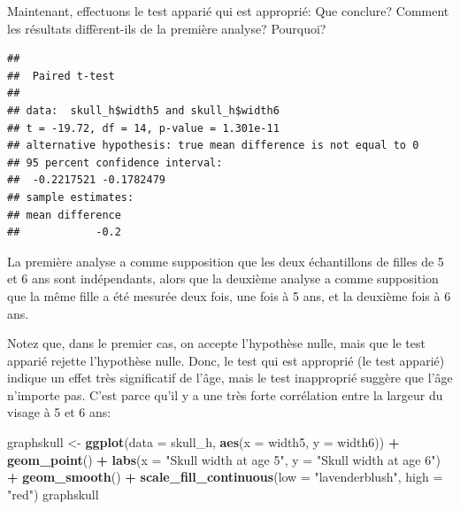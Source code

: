 \documentclass[
  12pt,
]{book}
\newenvironment{Shaded}{\begin{snugshade}}{\end{snugshade}}
\newcommand{\DataTypeTok}[1]{\textcolor[rgb]{0.13,0.29,0.53}{#1}}
\newcommand{\KeywordTok}[1]{\textcolor[rgb]{0.13,0.29,0.53}{\textbf{#1}}}
\newcommand{\NormalTok}[1]{#1}
\newcommand{\OperatorTok}[1]{\textcolor[rgb]{0.81,0.36,0.00}{\textbf{#1}}}
\newcommand{\OtherTok}[1]{\textcolor[rgb]{0.56,0.35,0.01}{#1}}
\newcommand{\StringTok}[1]{\textcolor[rgb]{0.31,0.60,0.02}{#1}}
\begin{document}
Maintenant, effectuons le test apparié qui est approprié: Que conclure? Comment les résultats diffèrent-ils de la première analyse? Pourquoi?

\begin{Shaded}
\end{Shaded}

\begin{verbatim}
## 
##  Paired t-test
## 
## data:  skull_h$width5 and skull_h$width6
## t = -19.72, df = 14, p-value = 1.301e-11
## alternative hypothesis: true mean difference is not equal to 0
## 95 percent confidence interval:
##  -0.2217521 -0.1782479
## sample estimates:
## mean difference 
##            -0.2
\end{verbatim}

La première analyse a comme supposition que les deux échantillons de filles de 5 et 6 ans sont indépendants, alors que la deuxième analyse a comme supposition que la même fille a été mesurée deux fois, une fois à 5 ans, et la deuxième fois à 6 ans.

Notez que, dans le premier cas, on accepte l'hypothèse nulle, mais que le test apparié rejette l'hypothèse nulle. Donc, le test qui est approprié (le test apparié) indique un effet très significatif de l'âge, mais le test inapproprié suggère que l'âge n'importe pas. C'est parce qu'il y a une très forte corrélation entre la largeur du visage à 5 et 6 ans:

\begin{Shaded}
\begin{Highlighting}[]
\NormalTok{graphskull \textless{}{-}}\StringTok{ }\KeywordTok{ggplot}\NormalTok{(}\DataTypeTok{data =}\NormalTok{ skull\_h, }\KeywordTok{aes}\NormalTok{(}\DataTypeTok{x =}\NormalTok{ width5, }\DataTypeTok{y =}\NormalTok{ width6)) }\OperatorTok{+}
\StringTok{  }\KeywordTok{geom\_point}\NormalTok{() }\OperatorTok{+}
\StringTok{  }\KeywordTok{labs}\NormalTok{(}\DataTypeTok{x =} \StringTok{"Skull width at age 5"}\NormalTok{, }\DataTypeTok{y =} \StringTok{"Skull width at age 6"}\NormalTok{) }\OperatorTok{+}
\StringTok{  }\KeywordTok{geom\_smooth}\NormalTok{() }\OperatorTok{+}
\StringTok{  }\KeywordTok{scale\_fill\_continuous}\NormalTok{(}\DataTypeTok{low =} \StringTok{"lavenderblush"}\NormalTok{, }\DataTypeTok{high =} \StringTok{"red"}\NormalTok{)}
\NormalTok{graphskull}
\end{Highlighting}
\end{Shaded}
\end{document}
